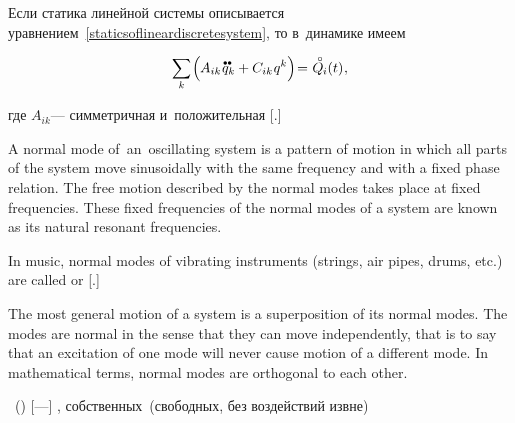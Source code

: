\label{para:smalloscillations}

\begin{otherlanguage}{russian}

Если статика линейной системы описывается уравнением~\eqref{staticsoflineardiscretesystem}, то в~динамике имеем

\nopagebreak\vspace{-0.4em}\begin{equation}\label{dynamicsoflineardiscretesystem}
\scalebox{0.95}[1]{$\displaystyle \sum_{\smash{k}}$} \hspace{-0.2ex} \left(^{\mathstrut} \hspace{-0.2ex} A_{ik} \hspace{.12ex} \mathdotdotabove{q}_k + C_{ik} \hspace{.12ex} q^k \right) \hspace{-0.4ex}
= \hspace{.1ex} \mathcircabove{Q}_{\hspace{-0.1ex}i}(t) \hspace{.1ex} ,
\vspace{-0.1em}\end{equation}

\vspace{-0.25em} \noindent где ${A_{ik}}$\:--- симметричная и~положительная [.]

{\small%
A normal mode of~an~oscillating system is a pattern of motion in which all parts of the system move sinusoidally with the same frequency and with a fixed phase relation. The free motion described by the normal modes takes place at fixed frequencies. These fixed frequencies of the normal modes of a system are known as its natural resonant frequencies.

In music, normal modes of vibrating instruments (strings, air pipes, drums, etc.) are called  or [.]

The most general motion of a system is a superposition of its normal modes. The modes are normal in the sense that they can move independently, that is to say that an excitation of one mode will never cause motion of a different mode. In mathematical terms, normal modes are orthogonal to each other.
\par}

  ~() [---] , собственных~(свободных, без воздействий извне)  


\end{otherlanguage}
